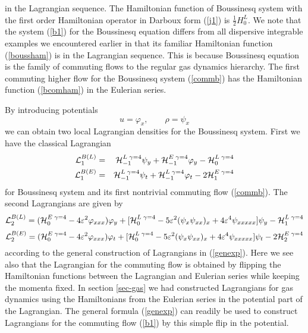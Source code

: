 \documentclass[a4paper,12pt]{article}
\begin{document}
in the Lagrangian sequence. The Hamiltonian function of Boussinesq
system with the first order Hamiltonian operator in Darboux form
(\ref{j1}) is $\frac{1}{2}H_{0}^{L}$. We note that the system
(\ref{b1}) for the Boussinesq equation differs from all dispersive
integrable examples we encountered earlier in that its familiar
Hamiltonian function (\ref{boussham}) is in the Lagrangian
sequence. This is because Boussinesq equation is the family of
commuting flows to the regular gas dynamics hierarchy. The first
commuting higher flow for the Boussinesq system (\ref{commb}) has
the Hamiltonian function (\ref{bcomham}) in the Eulerian series.

By introducing potentials
\begin{equation}
 u =  \varphi_{x}, \qquad  \rho  =  \psi_{x}
\end{equation}
we can obtain two local Lagrangian densities for the Boussinesq
system. First we have the classical Lagrangian
\begin{eqnarray}
{\cal L}_{1}^{B(L)} & = & {\cal H}_{-1}^{L \; \gamma=4} \psi_{y}+
{\cal H}_{-1}^{E \; \gamma=4}
\varphi_{y}-{\cal H}_{0}^{L \; \gamma=4} \label{bol1} \\
{\cal L}_{1}^{B(E)} &=& {\cal H}_{-1}^{L \; \gamma=4} \psi _{t}+
{\cal H}_{-1}^{L \; \gamma=4} \varphi_{t}-2 {\cal H}_{1}^{E \;
\gamma=4} \label{cbol1}
\end{eqnarray}
for Boussinesq system and its first nontrivial commuting flow
(\ref{commb}). The second Lagrangians are given by
\begin{equation}
{\cal L}_{2}^{B(L)}= ( {\cal H}_{0}^{E \; \gamma=4} -4\varepsilon
^{2}\varphi _{xxx})\varphi _{y}+ [ {\cal H}_{0}^{L \; \gamma=4} -
5 \varepsilon ^{2} ( \psi _{x}\psi_{xx})_x +4\varepsilon
^{4}\psi_{xxxxx} ] \psi _{y} - {\cal H}_{1}^{L \; \gamma=4}
\end{equation}
\begin{equation}
{\cal L}_{2}^{B(E)} = ( {\cal H}_{0}^{E \; \gamma=4} -4\varepsilon
^{2}\varphi _{xxx})\varphi _{t}+ [ {\cal H}_{0}^{L \; \gamma=4} -
5 \varepsilon ^{2} ( \psi _{x}\psi_{xx})_x +4\varepsilon
^{4}\psi_{xxxxx} ] \psi _{t} - 2 {\cal H}_{2}^{E \; \gamma=4}
\end{equation}
according to the general construction of Lagrangians in
(\ref{genexp}). Here we see also that the Lagrangian for the
commuting flow is obtained by flipping the Hamiltonian functions
between the Lagrangian and Eulerian series while keeping the
momenta fixed. In section \ref{sec-gas} we had constructed
Lagrangians for gas dynamics using the Hamiltonians from the
Eulerian series in the potential part of the Lagrangian. The
general formula (\ref{genexp}) can readily be used to construct
Lagrangians for the commuting flow (\ref{b1}) by this simple flip
in the potential.
\end{document}
